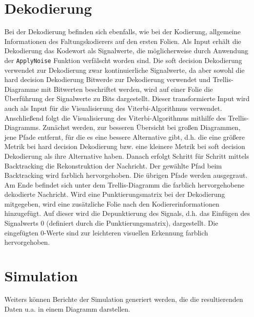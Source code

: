 \section{Dekodierung}
\label{kapitel:visualisierung_dekodierung}
Bei der Dekodierung befinden sich ebenfalls, wie bei der Kodierung, allgemeine Informationen des Faltungskodierers auf den ersten Folien.
Als Input erhält die Dekodierung das Kodewort als Signalwerte, die möglicherweise durch Anwendung der \texttt{ApplyNoise} Funktion verfälscht worden sind. Die soft decision Dekodierung verwendet zur Dekodierung zwar kontinuierliche Signalwerte, da aber sowohl die hard decision Dekodierung Bitwerde zur Dekodierung verwendet und Trellis-Diagramme mit Bitwerten beschriftet werden, wird auf einer Folie die Überführung der Signalwerte zu Bits dargestellt. Dieser transformierte Input wird auch als Input für die Visualisierung des Viterbi-Algorithmus verwendet.
Anschließend folgt die Visualisierung des Viterbi-Algorithmus mithilfe des Trellis-Diagramms. Zunächst werden, zur besseren Übersicht bei großen Diagrammen, jene Pfade entfernt, für die es eine bessere Alternative gibt, d.h. die eine größere Metrik bei hard decision Dekodierung bzw. eine kleinere Metrik bei soft decision Dekodierung als ihre Alternative haben. Danach erfolgt Schritt für Schritt mittels Backtracking die Rekonstruktion der Nachricht. Der gewählte Pfad beim Backtracking wird farblich hervorgehoben. Die übrigen Pfade werden ausgegraut. Am Ende befindet sich unter dem Trellis-Diagramm die farblich hervorgehobene dekodierte Nachricht.
Wird eine Punktierungsmatrix bei der Dekodierung mitgegeben, wird eine zusätzliche Folie nach den Kodiererinformationen hinzugefügt. Auf dieser wird die Depunktierung des Signals, d.h. das Einfügen des Signalwerts 0 (definiert durch die Punktierungsmatrix), dargestellt. Die eingefügten 0-Werte sind zur leichteren visuellen Erkennung farblich hervorgehoben.

\section{Simulation}
\label{kapitel:visualisierung_simulation}
Weiters können Berichte der Simulation generiert werden, die die resultierenden Daten u.a. in einem Diagramm darstellen.